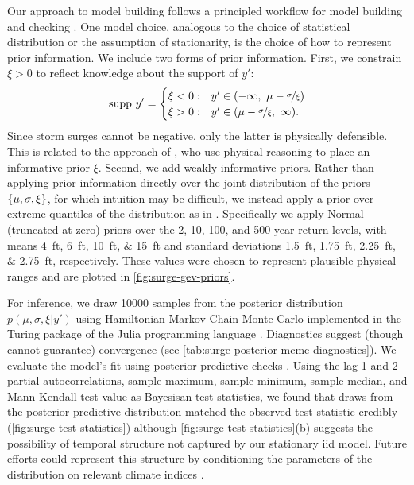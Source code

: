 \documentclass[12pt]{article}
\begin{document}
Our approach to model building follows a principled workflow for model building and checking \citep[see][for details]{gelman_workflow:2020}.
One model choice, analogous to the choice of statistical distribution or the assumption of stationarity, is the choice of how to represent prior information.
We include two forms of prior information.
First, we constrain $\xi > 0$ to reflect knowledge about the support of $y'$:
\begin{equation*}
    \mathrm{supp}~ y' =
    \begin{cases}
        \xi < 0: & y' \in \qty(-\infty,~ \mu - \nicefrac{\sigma}{\xi}) \\
        \xi > 0: & y' \in \qty(\mu-\nicefrac{\sigma}{\xi},~ \infty).
    \end{cases}
\end{equation*}
Since storm surges cannot be negative, only the latter is physically defensible.
This is related to the approach of \citet{martins_estimators:2000}, who use physical reasoning to place an informative prior $\xi$.
Second, we add weakly informative priors.
Rather than applying prior information directly over the joint distribution of the priors $\qty{\mu,\sigma,\xi}$, for which intuition may be difficult, we instead apply a prior over extreme quantiles of the distribution as in \citet{coles_evd:1996}.
Specifically we apply Normal (truncated at zero) priors over the 2, 10, 100, and 500 year return levels, with means \SIlist{4;6;10;15}{ft} and standard deviations \SIlist{1.5;1.75;2.25;2.75}{ft}, respectively.
These values were chosen to represent plausible physical ranges and are plotted in \cref{fig:surge-gev-priors}.

For inference, we draw \num{10000} samples from the posterior distribution $p(\mu,\sigma,\xi | y')$ using Hamiltonian Markov Chain Monte Carlo \citep{Betancourt:2017vd,hoffman_nuts:2011} implemented in the Turing package of the Julia programming language \citep{perkel_julia:2019,ge_turing:2018,tarek_dynamicppl:2020,besancon_distributions.jl:2021,bezanson_julia:2012}.
Diagnostics suggest (though cannot guarantee) convergence (see \cref{tab:surge-posterior-mcmc-diagnostics}).
We evaluate the model's fit using posterior predictive checks \citep[section 2.4 and references therein]{gelman_workflow:2020}.
Using the lag 1 and 2 partial autocorrelations, sample maximum, sample minimum, sample median, and Mann-Kendall test value as Bayesisan test statistics, we found that draws from the posterior predictive distribution matched the observed test statistic credibly (\cref{fig:surge-test-statistics}) although \cref{fig:surge-test-statistics}(b) suggests the possibility of temporal structure not captured by our stationary \gls{iid} model.
Future efforts could represent this structure by conditioning the parameters of the distribution on relevant climate indices \citep[as in][]{wong_structural:2020,Farnham:2016tw,farnham_jetstream:2017}.
\end{document}
